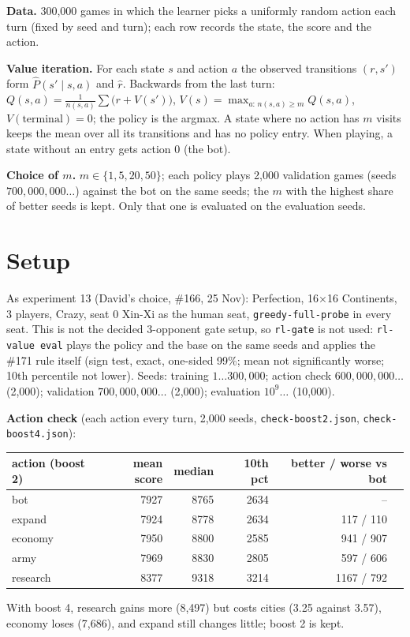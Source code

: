 \documentclass{../polyexp}
\begin{document}
\textbf{Data.} 300{,}000 games in which the learner picks a uniformly random action each turn (fixed by seed and
turn); each row records the state, the score and the action.

\textbf{Value iteration.} For each state $s$ and action $a$ the observed transitions $(r, s')$ form $\hat P(s'\mid
s,a)$ and $\hat r$. Backwards from the last turn: $Q(s,a) = \frac{1}{n(s,a)}\sum \bigl(r + V(s')\bigr)$,
$V(s) = \max_{a:\,n(s,a) \ge m} Q(s,a)$, $V(\text{terminal}) = 0$; the policy is the argmax. A state where no action
has $m$ visits keeps the mean over all its transitions and has no policy entry. When playing, a state without an
entry gets action 0 (the bot).

\textbf{Choice of $m$.} $m \in \{1, 5, 20, 50\}$; each policy plays 2{,}000 validation games (seeds
$700{,}000{,}000\dots$) against the bot on the same seeds; the $m$ with the highest share of better seeds is kept.
Only that one is evaluated on the evaluation seeds.

\section{Setup}
As experiment 13 (David's choice, \#166, 25 Nov): Perfection, 16$\times$16 Continents, 3 players, Crazy, seat 0
Xin-Xi as the human seat, \texttt{greedy-full-probe} in every seat. This is not the decided 3-opponent gate setup,
so \texttt{rl-gate} is not used: \texttt{rl-value eval} plays the policy and the base on the same seeds and applies
the \#171 rule itself (sign test, exact, one-sided 99\%; mean not significantly worse; 10th percentile not lower).
Seeds: training $1\dots300{,}000$; action check $600{,}000{,}000\dots$ (2{,}000); validation
$700{,}000{,}000\dots$ (2{,}000); evaluation $10^9\dots$ (10{,}000).

\textbf{Action check} (each action every turn, 2{,}000 seeds, \texttt{check-boost2.json}, \texttt{check-boost4.json}):

\begin{center}\small
\begin{tabular}{lrrrrr}
\toprule
action (boost 2) & mean score & median & 10th pct & better / worse vs bot \\
\midrule
bot      & 7927 & 8765 & 2634 & -- \\
expand   & 7924 & 8778 & 2634 & 117 / 110 \\
economy  & 7950 & 8800 & 2585 & 941 / 907 \\
army     & 7969 & 8830 & 2805 & 597 / 606 \\
research & 8377 & 9318 & 3214 & 1167 / 792 \\
\bottomrule
\end{tabular}
\end{center}
With boost 4, research gains more (8{,}497) but costs cities (3.25 against 3.57), economy loses (7{,}686), and
expand still changes little; boost 2 is kept.
\end{document}
